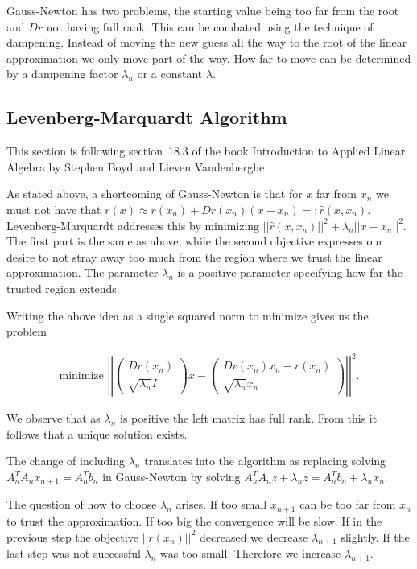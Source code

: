 Gauss-Newton has two problems, the starting value being too far from the root and $Dr$ not having full rank. This can be combated using the technique of dampening. Instead of moving the new guess all the way to the root of the linear approximation we only move part of the way. How far to move can be determined by a dampening factor $\lambda_n$ or a constant $\lambda$.

\subsection{Levenberg-Marquardt Algorithm}

This section is following section~18.3 of the book Introduction to Applied Linear Algebra by Stephen Boyd and Lieven Vandenberghe\cite{Boyd2018}.

As stated above, a shortcoming of Gauss-Newton is that for $x$ far from $x_n$ we must not have that $r(x) \approx r(x_n) + Dr(x_n)(x-x_n) =: \hat{r}(x, x_n)$. Levenberg-Marquardt addresses this by minimizing $||\hat{r}(x, x_n)||^2 + \lambda_n ||x-x_n||^2$. The first part is the same as above, while the second objective expresses our desire to not stray away too much from the region where we trust the linear approximation. The parameter $\lambda_n$ is a positive parameter specifying how far the trusted region extends.

Writing the above idea as a single squared norm to minimize gives us the problem

\begin{align*}
	\text{minimize }
	\left|\left|\left(\begin{matrix}
		Dr(x_n)\\ \sqrt{\lambda_n}I
	\end{matrix}\right) x - \left(\begin{matrix}
		Dr(x_n)x_n - r(x_n)\\ \sqrt{\lambda_n} x_n
	\end{matrix}\right)\right|\right|^2.
\end{align*}

We observe that as $\lambda_n$ is positive the left matrix has full rank. From this it follows that a unique solution exists.

The change of including $\lambda_n$ translates into the algorithm as replacing solving $A_n^TA_nx_{n+1} = A_n^Tb_n$ in Gauss-Newton by solving $A_n^T A_n z + \lambda_n z= A_n^T b_n + \lambda_n x_n$.

The question of how to choose $\lambda_n$ arises. If too small $x_{n+1}$ can be too far from $x_n$ to trust the approximation. If too big the convergence will be slow. If in the previous step the objective $||r(x_n)||^2$ decreased we decrease $\lambda_{n+1}$ slightly. If the last step was not successful $\lambda_n$ was too small. Therefore we increase $\lambda_{n+1}$.

